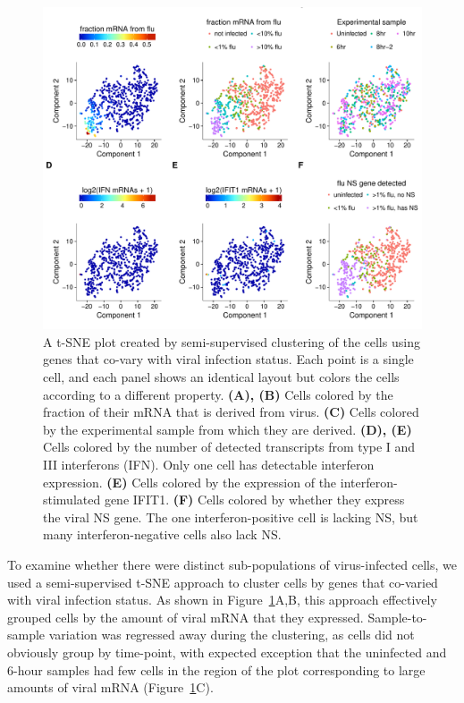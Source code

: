 \documentclass[9pt,lineno]{elife}
\begin{document}
\begin{figure}
\centerline{\includegraphics[width=0.8\linewidth]{figures/p_small_tsne_merge.pdf}}
\caption{\label{fig:tsne}
A t-SNE plot created by semi-supervised clustering of the cells using genes that co-vary with viral infection status.
Each point is a single cell, and each panel shows an identical layout but colors the cells according to a different property.
{\bf (A), (B)}
Cells colored by the fraction of their mRNA that is derived from virus.
{\bf (C)}
Cells colored by the experimental sample from which they are derived.
{\bf (D), (E)}
Cells colored by the number of detected transcripts from type I and III interferons (IFN).
Only one cell has detectable interferon expression.
{\bf (E)}
Cells colored by the expression of the interferon-stimulated gene IFIT1.
{\bf (F)}
Cells colored by whether they express the viral NS gene.
The one interferon-positive cell is lacking NS, but many interferon-negative cells also lack NS.
}

\end{figure}

To examine whether there were distinct sub-populations of virus-infected cells, we used a semi-supervised t-SNE approach to cluster cells by genes that co-varied with viral infection status.
As shown in Figure~\ref{fig:tsne}A,B, this approach effectively grouped cells by the amount of viral mRNA that they expressed.
Sample-to-sample variation was regressed away during the clustering, as cells did not obviously group by time-point, with expected exception that the uninfected and 6-hour samples had few cells in the region of the plot corresponding to large amounts of viral mRNA (Figure~\ref{fig:tsne}C).
\end{document}
